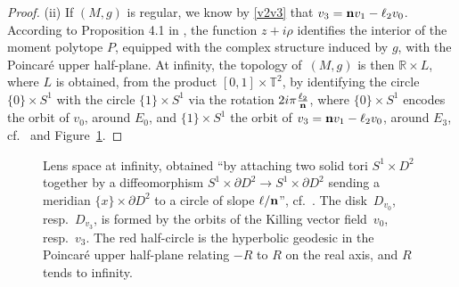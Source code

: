 \documentclass[10pt,a4paper]{amsart}
\numberwithin{equation}{section}
\begin{document}
\begin{proof}
(ii) If $(M, g)$ is regular, we know by \eqref{v2v3} that $v _3 = {\bf n} v _1 - \ell _2 v _0$. According to Proposition 4.1 in \cite{BG}, the function $z + i \rho$ identifies the interior of the moment polytope $P$, equipped with the complex structure induced by $g$, with the Poincar\'e upper half-plane. At infinity, the topology of~$(M, g)$ is then $\mathbb{R} \times L$, where $L$ is obtained, from the product $[0, 1] \times \mathbb{T} ^2$, by identifying the circle $\{0\} \times S^1$ with the circle $\{1\} \times S^1$ via the rotation $2 i \pi \frac{\ell _2}{{\bf n}}$, where $\{0\} \times S^1$ encodes the orbit of $v _0$, around $E _0$, and $\{1\} \times S^1$ the orbit of $v _3 = {\bf n} v _1 - \ell _2 v _0$, around $E _3$, cf.\ \cite{hatcher,saveliev} and Figure~\ref{fig:lens}.
\end{proof}


 \begin{figure}[t]\centering
{}
\caption{Lens space at infinity, obtained ``by attaching two solid tori $S^1 \times D^2$ together by a diffeomorphism $S^1 \times \partial D^2 \to S^1 \times \partial D^2$ sending a meridian $\{x\} \times \partial D^2$ to a circle of slope $\ell/{\bf n}$'', cf.\ \cite{hatcher}. The disk~$D _{v _0}$, resp.\ $D _{v_3}$, is formed by the orbits of the Killing vector field~$v_0$, resp.~$v _3$. The red half-circle is the hyperbolic geodesic in the Poincar\'e upper half-plane relating $- R$ to $R$ on the real axis, and $R$ tends to infinity.}
\label{fig:lens}
\end{figure}
\end{document}
